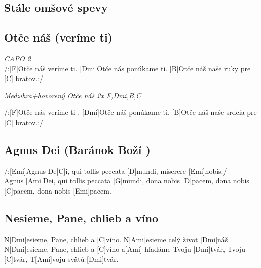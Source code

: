 \documentclass[10pt]{article}
\begin{document}
\begin{Large}\renewcommand\guitarPreAccord{\normalsize\strut}

\section{Stále omšové spevy}

\begin{multicols}{2}
\begin{minipage}{\textwidth}
\subsection{Otče náš (veríme ti)}
\begin{guitar}
	\textit{CAPO 2}\\
	/:[F]Otče náš veríme ti.
	[Dmi]Otče nás ponúkame ti.
	[B]Otče náš naše ruky pre [C] bratov.:/
	
	\textit{Medzihra+hovorený Otče náš 
		2x F,Dmi,B,C}
	
	/:[F]Otče nás veríme ti .
	[Dmi]Otče náš ponúkame ti.
	[B]Otče náš naše srdcia pre [C] bratov.:/
\end{guitar}
\end{minipage}

\begin{minipage}{\textwidth}
\subsection{Agnus Dei (Baránok Boží )}
\begin{guitar}
	/:[Emi]Agnus De[C]i, qui tollis peccata [D]mundi, 
	miserere [Emi]nobis:/
	\\
	[G]Agnus [Ami]Dei, qui tollis peccata [G]mundi, 
	dona nobis [D]pacem, dona nobis [C]pacem,
	dona nobis [Emi]pacem.
\end{guitar}
\end{minipage}
\end{multicols}

\begin{multicols}{2}
\begin{minipage}{\textwidth}
\subsection{Nesieme, Pane, chlieb a víno}
\begin{guitar}
	N[Dmi]esieme, Pane, chlieb a [C]víno.
	N[Ami]esieme celý život [Dmi]náš.
	N[Dmi]esieme, Pane, chlieb a [C]víno
	a[Ami] hľadáme Tvoju [Dmi]tvár, Tvoju [C]tvár,
	T[Ami]voju svätú [Dmi]tvár.
\end{guitar}
\end{minipage}


\end{multicols}
\end{Large}
\end{document}
